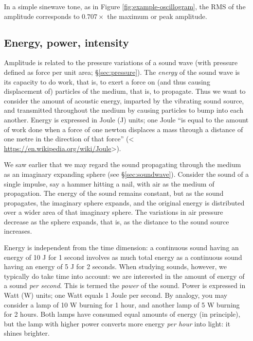\documentclass[
]{book}
\begin{document}
In a simple sinewave tone, as in Figure \ref{fig:example-oscillogram}, the RMS of the amplitude corresponds to \(0.707 \times\) the maximum or peak amplitude.

\subsection{Energy, power, intensity}\label{sec:intensity}

Amplitude is related to the pressure variations of a sound wave (with pressure defined as force per unit area; §\ref{sec:pressure}). The \emph{energy} of the sound wave is its capacity to do work, that is, to exert a force on (and thus causing displacement of) particles of the medium, that is, to propagate. Thus we want to consider the amount of acoustic energy, imparted by the vibrating sound source, and transmitted throughout the medium by causing particles to bump into each another. Energy is expressed in Joule (J) units; one Joule ``is equal to the amount of work done when a force of one newton displaces a mass through a distance of one metre in the direction of that force'' (\textless{} \url{https://en.wikipedia.org/wiki/Joule}\textgreater).

We saw earlier that we may regard the sound propagating through the medium as an imaginary expanding sphere (see §\ref{sec:soundwave}). Consider the sound of a single impulse, say a hammer hitting a nail, with air as the medium of propagation. The energy of the sound remains constant, but as the sound propagates, the imaginary sphere expands, and the original energy is distributed over a wider area of that imaginary sphere. The variations in air pressure decrease as the sphere expands, that is, as the distance to the sound source increases.

Energy is independent from the time dimension: a continuous sound having an energy of 10 J for 1 second involves as much total energy as a continuous sound having an energy of 5 J for 2 seconds. When studying sounds, however, we typically do take time into account: we are interested in the amount of energy of a sound \emph{per second}. This is termed the \emph{power} of the sound. Power is expressed in Watt (W) units; one Watt equals 1 Joule per second. By analogy, you may consider a lamp of 10 W burning for 1 hour, and another lamp of 5 W burning for 2 hours. Both lamps have consumed equal amounts of energy (in principle), but the lamp with higher power converts more energy \emph{per hour} into light: it shines brighter.
\end{document}
